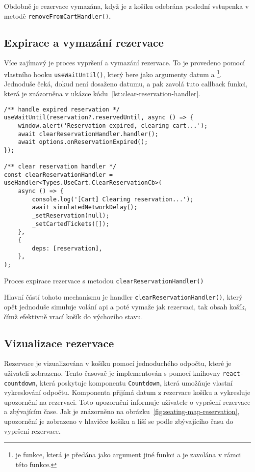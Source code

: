 Obdobně je rezervace vymazána, když je z košíku odebrána poslední vstupenka v metodě \texttt{removeFromCartHandler()}.

\subsection{Expirace a vymazání rezervace}
\label{subsec:implementace-rezervace-expirace}
Více zajímavý je proces vypršení a vymazání rezervace.
To je provedeno pomocí vlastního hooku \texttt{useWaitUntil()}, který bere jako argumenty datum a \footnote{ je funkce, která je předána jako argument jiné funkci a je zavolána v rámci této funkce.}.
Jednoduše čeká, dokud není dosaženo datumu, a pak zavolá tuto callback funkci, která je znázorněna v ukázce kódu~\ref{lst:clear-reservation-handler}.

\begin{listing}[!h]
\begin{verbatim}
/** handle expired reservation */
useWaitUntil(reservation?.reservedUntil, async () => {
	window.alert('Reservation expired, clearing cart...');
	await clearReservationHandler.handler();
	await options.onReservationExpired();
});

/** clear reservation handler */
const clearReservationHandler = useHandler<Types.UseCart.ClearReservationCb>(
	async () => {
		console.log('[Cart] Clearing reservation...');
		await simulatedNetworkDelay();
		_setReservation(null);
		_setCartedTickets([]);
	},
	{
		deps: [reservation],
	},
);
\end{verbatim}
\caption{Proces expirace rezervace s metodou \texttt{clearReservationHandler()}}
\label{lst:clear-reservation-handler}
\end{listing}

Hlavní částí tohoto mechanismu je handler \texttt{clearReservationHandler()}, který opět jednoduše simuluje volání \ac{api} a poté vymaže jak rezervaci, tak obsah košík, čímž efektivně vrací košík do výchozího stavu.

\subsection{Vizualizace rezervace}
\label{subsec:implementace-rezervace-vizualizace}
Rezervace je vizualizována v košíku pomocí jednoduchého odpočtu, které je uživateli zobrazeno.
Tento časovač je implementován s pomocí knihovny \texttt{react-countdown}, která poskytuje komponentu \texttt{Countdown}, která umožňuje vlastní vykreslování odpočtu.
Komponenta přijímá datum z rezervace košíku a vykresluje upozornění na rezervaci.
Toto upozornění informuje uživatele o vypršení rezervace a zbývajícím čase.
Jak je znázorněno na obrázku~\ref{fig:seating-map-reservation}, upozornění je zobrazeno v hlavičce košíku a liší se podle zbývajícího času do vypršení rezervace.

